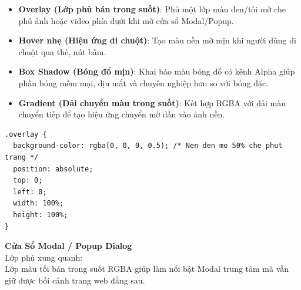 \begin{conceptBox}
\begin{itemize}[leftmargin=1.5em, itemsep=3pt, parsep=0pt]
    \item \textbf{Overlay (Lớp phủ bán trong suốt)}: Phủ một lớp màu đen/tối mờ che phủ ảnh hoặc video phía dưới khi mở cửa sổ Modal/Popup.
    \item \textbf{Hover nhẹ (Hiệu ứng di chuột)}: Tạo màu nền mờ mịn khi người dùng di chuột qua thẻ, nút bấm.
    \item \textbf{Box Shadow (Bóng đổ mịn)}: Khai báo màu bóng đổ có kênh Alpha giúp phần bóng mềm mại, dịu mắt và chuyên nghiệp hơn so với bóng đặc.
    \item \textbf{Gradient (Dải chuyển màu trong suốt)}: Kết hợp RGBA với dải màu chuyển tiếp để tạo hiệu ứng chuyển mờ dần vào ảnh nền.
\end{itemize}
\end{conceptBox}

\begin{codeWindow}
\begin{lstlisting}[language=CSS3]
.overlay {
  background-color: rgba(0, 0, 0, 0.5); /* Nen den mo 50% che phut trang */
  position: absolute;
  top: 0;
  left: 0;
  width: 100%;
  height: 100%;
}
\end{lstlisting}
\end{codeWindow}

\begin{browserWindow}
\begin{tcolorbox}[
    enhanced,
    colback=black!65,
    colframe=black!80,
    arc=6pt, boxrule=0.8pt,
    top=14pt, bottom=14pt, left=14pt, right=14pt
]
  \centering
  \begin{tcolorbox}[
      enhanced,
      width=0.88\linewidth,
      colback=white,
      colframe=primaryBlue!40,
      arc=6pt, boxrule=1pt,
      top=10pt, bottom=10pt, left=12pt, right=12pt,
      drop shadow=black!40!white
  ]
    \centering
    {\sffamily\bfseries\large\color{primaryBlue} Cửa Sổ Modal / Popup Dialog}\\[6pt]
    {\sffamily\small\color{darkText} Lớp phủ xung quanh: }\\[4pt]
    {\sffamily\small\color{gray} Lớp màu tối bán trong suốt RGBA giúp làm nổi bật Modal trung tâm mà vẫn giữ được bối cảnh trang web đằng sau.}
  \end{tcolorbox}
\end{tcolorbox}
\end{browserWindow}

